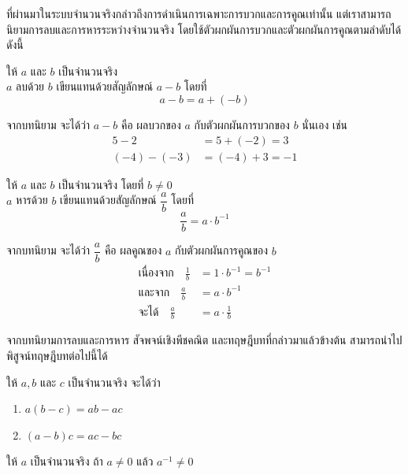 ที่ผ่านมาในระบบจำนวนจริงกล่าวถึงการดำเนินการเฉพาะการบวกและการคูณเท่านั้น แต่เราสามารถนิยามการลบและการหารระหว่างจำนวนจริง โดยใช้ตัวผกผันการบวกและตัวผกผันการคูณตามลำดับได้ดังนี้

\begin{definitionbox}
	ให้ $a$ และ $b$ เป็นจำนวนจริง
	\\[0.5em]
	$a$ ลบด้วย $b$ เขียนแทนด้วยสัญลักษณ์ $a - b$ โดยที่
	\begin{equation*}
		a - b = a + (-b)
	\end{equation*}
\end{definitionbox}

จากบทนิยาม จะได้ว่า $a - b$ คือ ผลบวกของ $a$ กับตัวผกผันการบวกของ $b$ นั่นเอง เช่น
\begin{align*}
	5 - 2 &= 5 + (-2) = 3 \\
	(-4) - (-3) &= (-4) + 3 = -1
\end{align*}

\begin{definitionbox}
	ให้ $a$ และ $b$ เป็นจำนวนจริง โดยที่ $b \neq 0$
	\\[0.5em]
	$a$ หารด้วย $b$ เขียนแทนด้วยสัญลักษณ์ $\dfrac{a}{b}$ โดยที่
	\begin{equation*}
		\frac{a}{b} = a \cdot b^{-1}
	\end{equation*}
\end{definitionbox}

จากบทนิยาม จะได้ว่า $\dfrac{a}{b}$ คือ ผลคูณของ $a$ กับตัวผกผันการคูณของ $b$
\begin{align*}
	\text{เนื่องจาก} \quad \frac{1}{b} &= 1 \cdot b^{-1} = b^{-1} \\
	\text{และจาก} \quad \frac{a}{b} &= a \cdot b^{-1} \\
	\text{จะได้} \quad \frac{a}{b} &= a \cdot \frac{1}{b}
\end{align*}

จากบทนิยามการลบและการหาร สัจพจน์เชิงพีชคณิต และทฤษฎีบทที่กล่าวมาแล้วข้างต้น สามารถนำไปพิสูจน์ทฤษฎีบทต่อไปนี้ได้

\begin{theorembox}
ให้ $a, b$ และ $c$ เป็นจำนวนจริง จะได้ว่า
\begin{enumerate}
\item $a(b-c)=a b-a c$
\item  $(a-b) c=a c-b c$
\end{enumerate}
\end{theorembox}


\begin{theorembox}
	ให้ $a$ เป็นจำนวนจริง ถ้า $a \neq 0$ แล้ว $a^{-1} \neq 0$
\end{theorembox}

